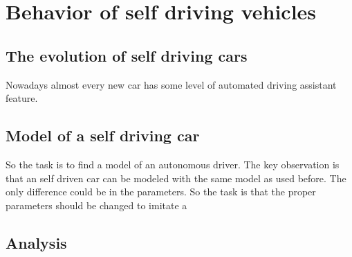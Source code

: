 \chapter{Behavior of self driving vehicles}
	\section{The evolution of self driving cars}
		Nowadays almost every new car has some level of automated driving assistant feature.
	\section{Model of a self driving car}
		So the task is to find a model of an autonomous driver. The key observation is that an self driven car can be modeled with the same model as used before. The only difference could be in the parameters. So the task is that the proper parameters should be changed to imitate a 
	\section{Analysis}